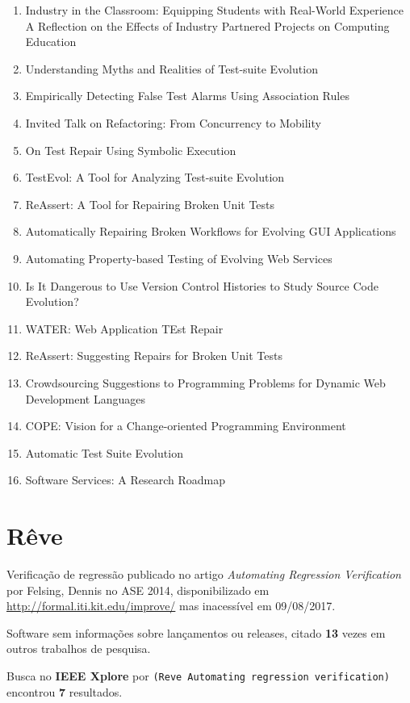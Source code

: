 \begin{enumerate}
\item Industry in the Classroom: Equipping Students with Real-World Experience A Reflection on the Effects of Industry Partnered Projects on Computing Education
\item Understanding Myths and Realities of Test-suite Evolution
\item Empirically Detecting False Test Alarms Using Association Rules
\item Invited Talk on Refactoring: From Concurrency to Mobility
\item On Test Repair Using Symbolic Execution
\item TestEvol: A Tool for Analyzing Test-suite Evolution
\item ReAssert: A Tool for Repairing Broken Unit Tests
\item Automatically Repairing Broken Workflows for Evolving GUI Applications
\item Automating Property-based Testing of Evolving Web Services
\item Is It Dangerous to Use Version Control Histories to Study Source Code Evolution?
\item WATER: Web Application TEst Repair
\item ReAssert: Suggesting Repairs for Broken Unit Tests
\item Crowdsourcing Suggestions to Programming Problems for Dynamic Web Development Languages
\item COPE: Vision for a Change-oriented Programming Environment
\item Automatic Test Suite Evolution
\item Software Services: A Research Roadmap
\end{enumerate}

\section{Rêve}

Verificação de regressão
publicado no artigo {\it Automating Regression Verification}
por Felsing, Dennis
no ASE 2014,
disponibilizado em \url{http://formal.iti.kit.edu/improve/}
mas inacessível em 09/08/2017.

Software sem informações sobre lançamentos ou releases,
citado {\bf 13} vezes em outros trabalhos de pesquisa.

Busca no {\bf IEEE Xplore} por
\texttt{(Reve Automating regression verification)}
encontrou {\bf 7}
resultados.

